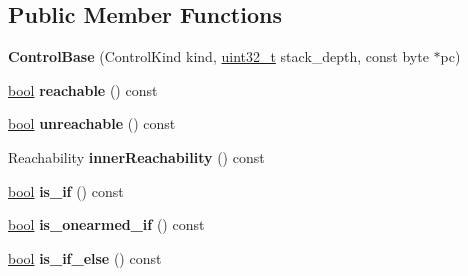 \subsection*{Public Member Functions}
\begin{DoxyCompactItemize}
\item 
\mbox{\label{structv8_1_1internal_1_1wasm_1_1ControlBase_a640451135ff407c5cad7f5bd242f5098}} 
{\bfseries Control\+Base} (Control\+Kind kind, \mbox{\hyperlink{classuint32__t}{uint32\+\_\+t}} stack\+\_\+depth, const byte $\ast$pc)
\item 
\mbox{\label{structv8_1_1internal_1_1wasm_1_1ControlBase_ad3d58f740350fb6d8ffae75fcc1ba470}} 
\mbox{\hyperlink{classbool}{bool}} {\bfseries reachable} () const
\item 
\mbox{\label{structv8_1_1internal_1_1wasm_1_1ControlBase_ae43a677437bb9cefa0b3f0b9e30df925}} 
\mbox{\hyperlink{classbool}{bool}} {\bfseries unreachable} () const
\item 
\mbox{\label{structv8_1_1internal_1_1wasm_1_1ControlBase_ab9257c38c413d241a68527765c292e3e}} 
Reachability {\bfseries inner\+Reachability} () const
\item 
\mbox{\label{structv8_1_1internal_1_1wasm_1_1ControlBase_a0c30433cdcd152e03cafbb5c6a7d6c88}} 
\mbox{\hyperlink{classbool}{bool}} {\bfseries is\+\_\+if} () const
\item 
\mbox{\label{structv8_1_1internal_1_1wasm_1_1ControlBase_aece2c93f899c2dea6471f160731f2d18}} 
\mbox{\hyperlink{classbool}{bool}} {\bfseries is\+\_\+onearmed\+\_\+if} () const
\item 
\mbox{\label{structv8_1_1internal_1_1wasm_1_1ControlBase_a98f193fe530a3ea9f2c033cba5554bf6}} 
\mbox{\hyperlink{classbool}{bool}} {\bfseries is\+\_\+if\+\_\+else} () const
\item 
\mbox{\label{structv8_1_1internal_1_1wasm_1_1ControlBase_aceccc980972cc93319d09da0b84505b1}} 

\end{DoxyCompactItemize}
